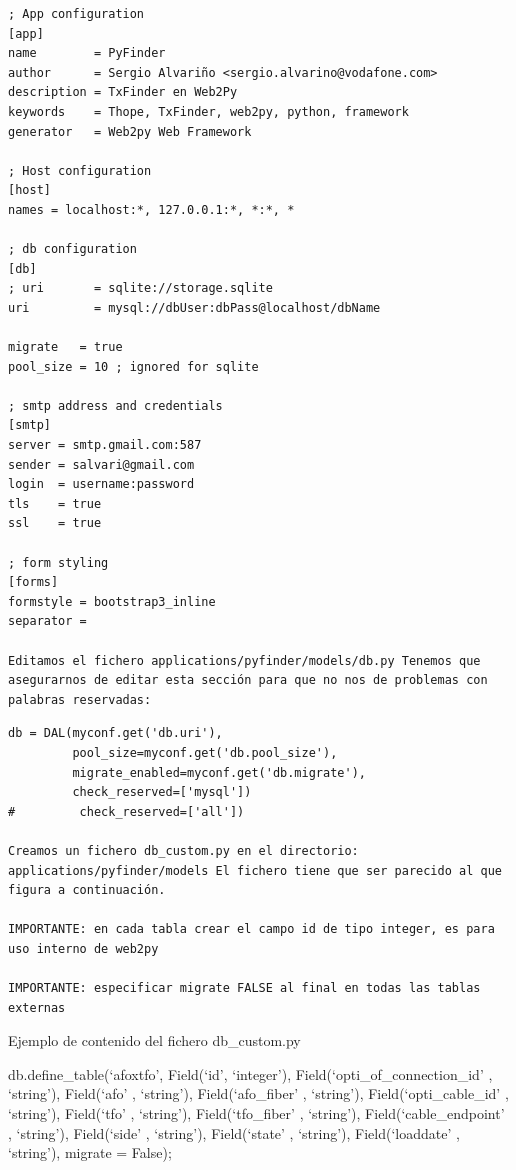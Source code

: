 \documentclass[
  12pt,
  spanish,
]{article}
\begin{document}
\begin{verbatim}
; App configuration
[app]
name        = PyFinder
author      = Sergio Alvariño <sergio.alvarino@vodafone.com>
description = TxFinder en Web2Py
keywords    = Thope, TxFinder, web2py, python, framework
generator   = Web2py Web Framework

; Host configuration
[host]
names = localhost:*, 127.0.0.1:*, *:*, *

; db configuration
[db]
; uri       = sqlite://storage.sqlite
uri         = mysql://dbUser:dbPass@localhost/dbName

migrate   = true
pool_size = 10 ; ignored for sqlite

; smtp address and credentials
[smtp]
server = smtp.gmail.com:587
sender = salvari@gmail.com
login  = username:password
tls    = true
ssl    = true

; form styling
[forms]
formstyle = bootstrap3_inline
separator =

Editamos el fichero applications/pyfinder/models/db.py Tenemos que asegurarnos de editar esta sección para que no nos de problemas con palabras reservadas:
\end{verbatim}

\begin{verbatim}
db = DAL(myconf.get('db.uri'),
         pool_size=myconf.get('db.pool_size'),
         migrate_enabled=myconf.get('db.migrate'),
         check_reserved=['mysql'])
#         check_reserved=['all'])

Creamos un fichero db_custom.py en el directorio: applications/pyfinder/models El fichero tiene que ser parecido al que figura a continuación.

IMPORTANTE: en cada tabla crear el campo id de tipo integer, es para uso interno de web2py

IMPORTANTE: especificar migrate FALSE al final en todas las tablas externas
\end{verbatim}

Ejemplo de contenido del fichero db\_custom.py

db.define\_table(`afoxtfo', Field(`id', `integer'),
Field(`opti\_of\_connection\_id' , `string'), Field(`afo' , `string'),
Field(`afo\_fiber' , `string'), Field(`opti\_cable\_id' , `string'),
Field(`tfo' , `string'), Field(`tfo\_fiber' , `string'),
Field(`cable\_endpoint' , `string'), Field(`side' , `string'),
Field(`state' , `string'), Field(`loaddate' , `string'), migrate =
False);
\end{document}
